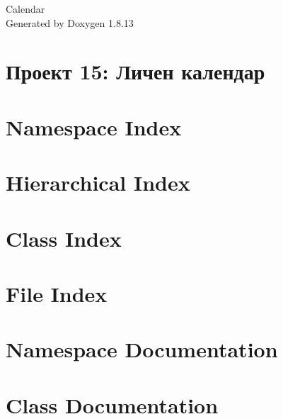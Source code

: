 \documentclass[twoside]{book}
\newcommand{\+}{\discretionary{\mbox{\scriptsize$\hookleftarrow$}}{}{}}
\newcommand{\clearemptydoublepage}{%
  \newpage{\pagestyle{empty}\cleardoublepage}%
}
\begin{document}
\hypersetup{pageanchor=false,
             bookmarksnumbered=true,
             pdfencoding=unicode
            }
\begin{titlepage}
\vspace*{7cm}
\begin{center}%
{\Large Calendar }\\
\vspace*{1cm}
{\large Generated by Doxygen 1.8.13}\\
\end{center}
\end{titlepage}
\clearemptydoublepage
{}
\tableofcontents
\clearemptydoublepage
{}
\hypersetup{pageanchor=true}

\chapter{Проект 15\+: Личен календар}
\label{index}\hypertarget{index}{}
\chapter{Namespace Index}

\chapter{Hierarchical Index}

\chapter{Class Index}

\chapter{File Index}

\chapter{Namespace Documentation}

\chapter{Class Documentation}


























\end{document}
